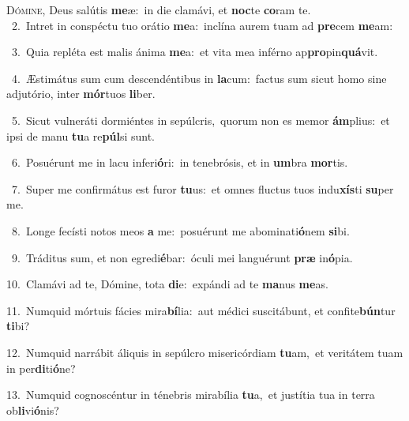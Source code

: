 \lettrine{\initial\textcolor{\initialcolor}{D}}{ómine,} Deus salútis \textbf{me}\-æ:~\star in die clamávi, et \textbf{noc}\-te \textbf{co}\-ram te.\\
{\numbfont\textcolor{\numbcolor}{~2.}}~Intret in conspéctu tuo orátio \textbf{me}\-a:~\star inclína aurem tuam ad \textbf{pre}\-cem \textbf{me}\-am:\par
{\numbfont\textcolor{\numbcolor}{~3.}}~Quia repléta est malis ánima \textbf{me}\-a:~\star et vita mea inférno ap\-\textbf{pro}\-pin\-\textbf{quá}\-vit.\par
{\numbfont\textcolor{\numbcolor}{~4.}}~Æstimátus sum cum descendéntibus in \textbf{la}\-cum:~\star factus sum sicut homo sine adjutório, inter \textbf{mór}\-tuos \textbf{li}\-ber.\par
{\numbfont\textcolor{\numbcolor}{~5.}}~Sicut vulneráti dormiéntes in sepúlcris,~\dagger quorum non es memor \textbf{ám}\-plius:~\star et ipsi de manu \textbf{tu}\-a re\-\textbf{púl}\-si sunt.\par
{\numbfont\textcolor{\numbcolor}{~6.}}~Posuérunt me in lacu inferi\-\textbf{ó}\-ri:~\star in tenebrósis, et in \textbf{um}\-bra \textbf{mor}\-tis.\par
{\numbfont\textcolor{\numbcolor}{~7.}}~Super me confirmátus est furor \textbf{tu}\-us:~\star et omnes fluctus tuos indu\-\textbf{xís}\-ti \textbf{su}\-per me.\par
{\numbfont\textcolor{\numbcolor}{~8.}}~Longe fecísti notos meos \textbf{a} me:~\star posuérunt me abominati\-\textbf{ó}\-nem \textbf{si}\-bi.\par
{\numbfont\textcolor{\numbcolor}{~9.}}~Tráditus sum, et non egredi\-\textbf{é}\-bar:~\star óculi mei languérunt \textbf{præ} in\-\textbf{ó}\-pia.\par
{\numbfont\textcolor{\numbcolor}{10.}}~Clamávi ad te, Dómine, tota \textbf{di}\-e:~\star expándi ad te \textbf{ma}\-nus \textbf{me}\-as.\par
{\numbfont\textcolor{\numbcolor}{11.}}~Numquid mórtuis fácies mira\-\textbf{bí}\-lia:~\star aut médici suscitábunt, et confite\-\textbf{bún}\-tur \textbf{ti}\-bi?\par
{\numbfont\textcolor{\numbcolor}{12.}}~Numquid narrábit áliquis in sepúlcro misericórdiam \textbf{tu}\-am,~\star et veritátem tuam in per\-\textbf{di}\-ti\-\textbf{ó}\-ne?\par
{\numbfont\textcolor{\numbcolor}{13.}}~Numquid cognoscéntur in ténebris mirabília \textbf{tu}\-a,~\star et justítia tua in terra ob\-\textbf{li}\-vi\-\textbf{ó}\-nis?\par
